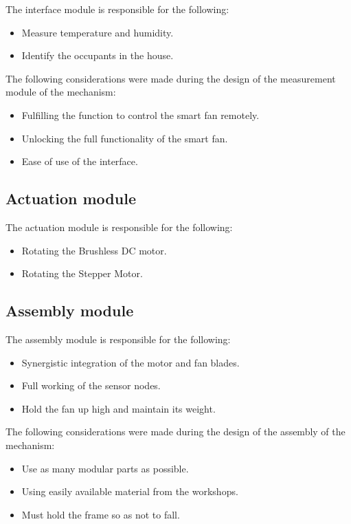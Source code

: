 The interface module is responsible for the following:
\begin{itemize}
\item Measure temperature and humidity.
\item Identify the occupants in the house.
\end{itemize}

The following considerations were made during the design of the measurement module of the mechanism:
\begin{itemize}
\item Fulfilling the function to control the smart fan remotely.
\item Unlocking the full functionality of the smart fan.
\item Ease of use of the interface.
\end{itemize}

\subsection{Actuation module}

The actuation module is responsible for the following:

\begin{itemize}
\item Rotating the Brushless \ac{DC} motor.
\item Rotating the Stepper Motor.
\end{itemize}


\subsection{Assembly module}

The assembly module is responsible for the following:
\begin{itemize}
\item Synergistic integration of the motor and fan blades.
\item Full working of the sensor nodes.
\item Hold the fan up high and maintain its weight.
\end{itemize}

The following considerations were made during the design of the assembly of the mechanism:
\begin{itemize}
\item Use as many modular parts as possible.
\item Using easily available material from the workshops.
\item Must hold the frame so as not to fall.
\end{itemize}

